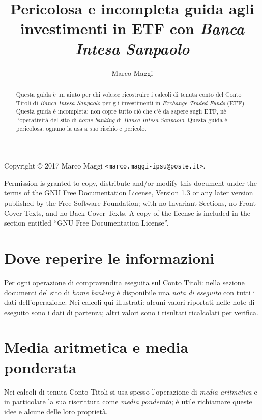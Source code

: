 \documentclass[12pt,a4paper]{article}
\author{Marco Maggi}
\title{Pericolosa e incompleta guida agli investimenti in ETF con \emph{Banca Intesa Sanpaolo}}
\begin{document}
\maketitle

\begin{abstract}
  Questa guida è un  aiuto per chi volesse ricostruire i calcoli  di tenuta conto del
  Conto Titoli di \emph{Banca Intesa Sanpaolo} per gli investimenti in \emph{Exchange
     Traded Funds} (ETF).  Questa guida è incompleta:  non copre tutto ciò che c'è da
  sapere sugli ETF,  né l'operatività del sito di \emph{home  banking} di \emph{Banca
     Intesa Sanpaolo}.   Questa guida  è pericolosa:  ognuno la usa  a suo  rischio e
  pericolo.
\end{abstract}

\tableofcontents

\newpage{}

\noindent
Copyright \copyright{} 2017 Marco Maggi \texttt{<marco.maggi-ipsu@poste.it>}.

Permission is granted to copy, distribute and/or modify this document under the terms
of the GNU Free Documentation License, Version  1.3 or any later version published by
the Free Software  Foundation; with no Invariant Sections, no  Front-Cover Texts, and
no Back-Cover Texts.  A copy of the license is included in the section entitled ``GNU
Free Documentation License''.

\newpage{}

\section{Dove reperire le informazioni}


Per  ogni  operazione di  compravendita  eseguita  sul  Conto Titoli:  nella  sezione
documenti del sito  di \emph{home banking} è disponibile una  \emph{nota di eseguito}
con  tutti  i  dati  dell'operazione.   Nei calcoli  qui  illustrati:  alcuni  valori
riportati  nelle note  di eseguito  sono  i dati  di  partenza; altri  valori sono  i
risultati ricalcolati per verifica.

\section{Media aritmetica e media ponderata}


Nei  calcoli  di tenuta  Conto  Titoli  si  usa  spesso l'operazione  di  \emph{media
   aritmetica} e  in particolare  la sua riscrittura  come \emph{media  ponderata}; è
utile richiamare queste idee e alcune delle loro proprietà.
\end{document}
